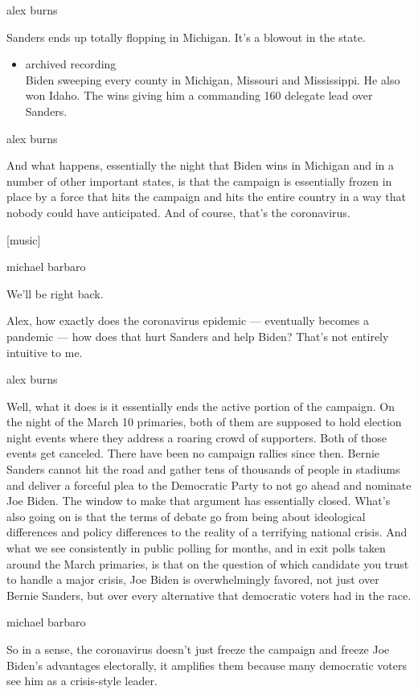 alex burns

Sanders ends up totally flopping in Michigan. It's a blowout in the
state.

\begin{itemize}
\tightlist
\item
  archived recording\\
  Biden sweeping every county in Michigan, Missouri and Mississippi. He
  also won Idaho. The wins giving him a commanding 160 delegate lead
  over Sanders.
\end{itemize}

alex burns

And what happens, essentially the night that Biden wins in Michigan and
in a number of other important states, is that the campaign is
essentially frozen in place by a force that hits the campaign and hits
the entire country in a way that nobody could have anticipated. And of
course, that's the coronavirus.

{[}music{]}

michael barbaro

We'll be right back.

Alex, how exactly does the coronavirus epidemic --- eventually becomes a
pandemic --- how does that hurt Sanders and help Biden? That's not
entirely intuitive to me.

alex burns

Well, what it does is it essentially ends the active portion of the
campaign. On the night of the March 10 primaries, both of them are
supposed to hold election night events where they address a roaring
crowd of supporters. Both of those events get canceled. There have been
no campaign rallies since then. Bernie Sanders cannot hit the road and
gather tens of thousands of people in stadiums and deliver a forceful
plea to the Democratic Party to not go ahead and nominate Joe Biden. The
window to make that argument has essentially closed. What's also going
on is that the terms of debate go from being about ideological
differences and policy differences to the reality of a terrifying
national crisis. And what we see consistently in public polling for
months, and in exit polls taken around the March primaries, is that on
the question of which candidate you trust to handle a major crisis, Joe
Biden is overwhelmingly favored, not just over Bernie Sanders, but over
every alternative that democratic voters had in the race.

michael barbaro

So in a sense, the coronavirus doesn't just freeze the campaign and
freeze Joe Biden's advantages electorally, it amplifies them because
many democratic voters see him as a crisis-style leader.

